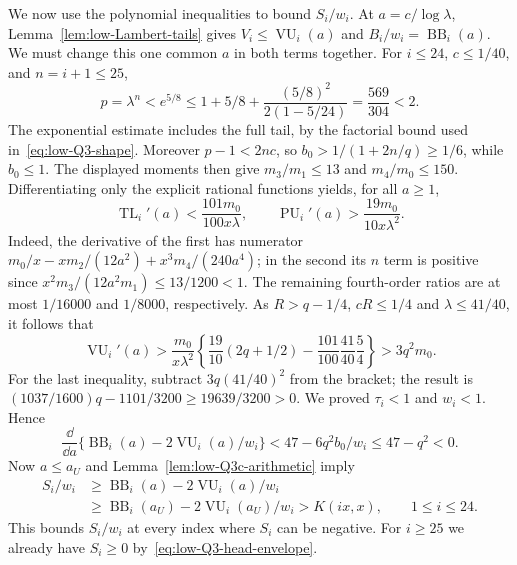 We now use the polynomial inequalities to bound $S_i/w_i$. At
$a=c/\log\lambda$, Lemma~\ref{lem:low-Lambert-tails} gives
$V_i\le\operatorname{VU}_i(a)$ and
$B_i/w_i=\operatorname{BB}_i(a)$.
We must change this one common $a$ in both terms together.
For $i\le24$, $c\le1/40$, and $n=i+1\le25$,
\[
 p=\lambda^n<e^{5/8}
 \le1+5/8+\frac{(5/8)^2}{2(1-5/24)}=\frac{569}{304}<2.
\]
The exponential estimate includes the full tail, by the factorial
bound used in~\eqref{eq:low-Q3-shape}.  Moreover
$p-1<2nc$, so $b_0>1/(1+2n/q)\ge1/6$, while $b_0\le1$.
The displayed moments then give $m_3/m_1\le13$ and
$m_4/m_0\le150$.
Differentiating only the explicit rational functions yields, for all
$a\ge1$,
\[
 \operatorname{TL}_i'(a)<\frac{101m_0}{100x\lambda},\qquad
 \operatorname{PU}_i'(a)>\frac{19m_0}{10x\lambda^2}.
\]
Indeed, the derivative of the first has numerator
$m_0/x-xm_2/(12a^2)+x^3m_4/(240a^4)$; in the second its
$n$ term is positive since $x^2m_3/(12a^2m_1)\le13/1200<1$.
The remaining fourth-order ratios are at most $1/16000$ and
$1/8000$, respectively.  As $R>q-1/4$, $cR\le1/4$ and
$\lambda\le41/40$, it follows that
\[
 \operatorname{VU}_i'(a)>
 \frac{m_0}{x\lambda^2}
 \left\{\frac{19}{10}(2q+1/2)
                 -\frac{101}{100}\frac{41}{40}\frac54\right\}
 >3q^2m_0.
\]
For the last inequality, subtract $3q(41/40)^2$ from the bracket;
the result is $(1037/1600)q-1101/3200\ge19639/3200>0$.
We proved $\tau_i<1$ and $w_i<1$.  Hence
\[
 \frac{\dd}{\dd a}
       \{\operatorname{BB}_i(a)-2\operatorname{VU}_i(a)/w_i\}
 <47-6q^2b_0/w_i\le47-q^2<0.
\]
Now $a\le a_U$ and Lemma~\ref{lem:low-Q3c-arithmetic} imply
\begin{equation}\label{eq:low-Q3c-actual-head}
 \begin{split}
 S_i/w_i&\ge\operatorname{BB}_i(a)-2\operatorname{VU}_i(a)/w_i\\
 &\ge\operatorname{BB}_i(a_U)-2\operatorname{VU}_i(a_U)/w_i
 >K(ix,x),\qquad1\le i\le24.
 \end{split}
\end{equation}
This bounds $S_i/w_i$ at every index where $S_i$ can be negative.
For $i\ge25$ we already have $S_i\ge0$ by~\eqref{eq:low-Q3-head-envelope}.

